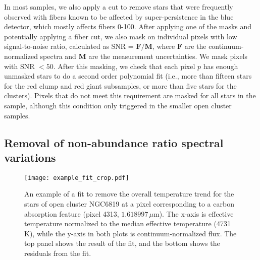 \documentclass[a4paper,fleqn,usenatbib]{mnras}
\newcommand       \mum      {{\,\mu\mathrm{m}}}
\begin{document}
In most samples, we also apply a cut to remove stars that were frequently observed with fibers known to be affected by super-persistence in the blue detector, which mostly affects fibers 0-100. After applying one of the masks and potentially applying a fiber cut, we also mask on individual pixels with low signal-to-noise ratio, calculated as SNR = $\mathbf{F}/\mathbf{M}$, where $\mathbf{F}$ are the continuum-normalized spectra and $\mathbf{M}$ are the measurement uncertainties. We mask pixels with SNR $< 50$. After this masking, we check that each pixel $p$ has enough unmasked stars to do a second order polynomial fit (i.e., more than fifteen stars for the red clump and red giant subsamples, or more than five stars for the clusters). Pixels that do not meet this requirement are masked for all stars in the sample, although this condition only triggered in the smaller open cluster samples.

\subsection{Removal of non-abundance ratio spectral variations}

\begin{figure}
\centering
\texttt{[image: example\_fit\_crop.pdf]}
\caption{ An example of a fit to remove the overall temperature trend for the stars of open cluster NGC6819 at a pixel corresponding to a carbon absorption feature (pixel 4313, $1.618997\mum$). The x-axis is effective temperature normalized to the median effective temperature (4731 K), while the y-axis in both plots is continuum-normalized flux. The top panel shows the result of the fit, and the bottom shows the residuals from the fit.}
\label{fig:fit}
\end{figure}
\end{document}
